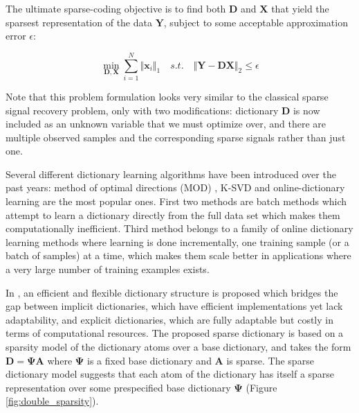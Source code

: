 \documentclass[journal]{IEEEtran}
\begin{document}
The ultimate sparse-coding objective is to find both $\boldsymbol{D}$ and $\boldsymbol{X}$ that yield the sparsest representation of the data $\boldsymbol{Y}$, subject to some acceptable approximation error $\epsilon$:

\begin{equation} \label{eq:dictionary_learning}
	\min\limits_{\boldsymbol{D}, \boldsymbol{X}}\sum\limits_{i=1}^N \Vert \boldsymbol{x}_i\Vert_1 \quad s.t.\quad \Vert \boldsymbol{Y}-\boldsymbol{D}\boldsymbol{X}\Vert_2\leq \epsilon
\end{equation}

Note that this problem formulation looks very similar to the classical sparse signal recovery problem, only with two modifications: dictionary $\boldsymbol{D}$ is now included as an unknown variable that we must optimize over, and there are multiple observed samples and the corresponding sparse signals rather than just one. 

Several different dictionary learning algorithms have been introduced over the past years: method of optimal directions (MOD) \cite{engan1999method}, K-SVD \cite{Aharon2006} and online-dictionary learning \cite{mairal2010online} are the most popular ones. First two methods are batch methods which attempt to learn a dictionary directly from the full data set which makes them computationally inefficient. Third method belongs to a family of online dictionary learning methods where learning is done incrementally, one training sample (or a batch of samples) at a time, which makes them scale better in applications where a very large number of training examples exists.

In \cite{Rubinstein2010}, an efficient and flexible dictionary structure is proposed which bridges the gap between implicit dictionaries, which have efficient implementations yet lack adaptability, and explicit dictionaries, which are fully adaptable but costly in terms of computational resources. The proposed sparse dictionary is based on a sparsity model of the dictionary atoms over a base dictionary, and takes the form $\boldsymbol{D}=\boldsymbol{\Psi}\boldsymbol{A}$ where $\boldsymbol{\Psi}$ is a fixed base dictionary and $\boldsymbol{A}$ is sparse. The sparse dictionary model suggests that each atom of the dictionary has itself a sparse representation over some prespecified base dictionary $\boldsymbol{\Psi}$ (Figure \ref{fig:double_sparsity}).
\end{document}
